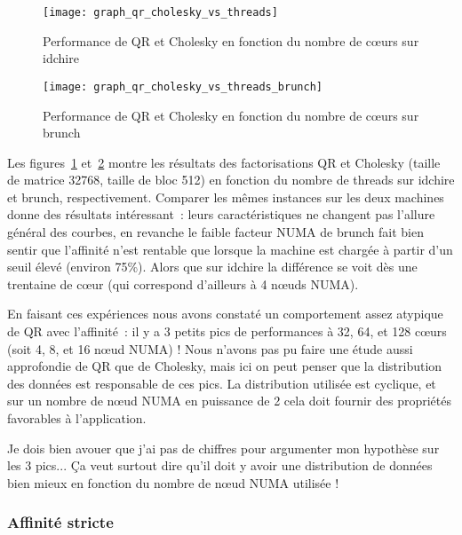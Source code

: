 \begin{figure}[t!]
  \centering
  \texttt{[image: graph\_qr\_cholesky\_vs\_threads]}
  \caption{Performance de QR et Cholesky en fonction du nombre de cœurs sur idchire}\label{fig:contribs:perf_eval:eval-qr-cholesky-idchire}
\end{figure}
\begin{figure}[h!]
  \centering
  \texttt{[image: graph\_qr\_cholesky\_vs\_threads\_brunch]}
  \caption{Performance de QR et Cholesky en fonction du nombre de cœurs sur brunch}\label{fig:contribs:perf_eval:eval-qr-cholesky-brunch}
\end{figure}

Les figures~\ref{fig:contribs:perf_eval:eval-qr-cholesky-idchire} et~\ref{fig:contribs:perf_eval:eval-qr-cholesky-brunch} montre les résultats des factorisations QR et Cholesky (taille de matrice 32768, taille de bloc 512) en fonction du nombre de threads sur idchire et brunch, respectivement.
Comparer les mêmes instances sur les deux machines donne des résultats intéressant~: leurs caractéristiques ne changent pas l'allure général des courbes, en revanche le faible facteur NUMA de brunch fait bien sentir que l'affinité n'est rentable que lorsque la machine est chargée à partir d'un seuil élevé (environ 75\%).
Alors que sur idchire la différence se voit dès une trentaine de cœur (qui correspond d'ailleurs à 4 nœuds NUMA).

En faisant ces expériences nous avons constaté un comportement assez atypique de QR avec l'affinité~: il y a 3 petits pics de performances à 32, 64, et 128 cœurs (soit 4, 8, et 16 nœud NUMA) !
Nous n'avons pas pu faire une étude aussi approfondie de QR que de Cholesky, mais ici on peut penser que la distribution des données est responsable de ces pics. La distribution utilisée est cyclique, et sur un nombre de nœud NUMA en puissance de 2 cela doit fournir des propriétés favorables à l'application.

\begin{todo}
  Je dois bien avouer que j'ai pas de chiffres pour argumenter mon hypothèse sur les 3 pics...
  Ça veut surtout dire qu'il doit y avoir une distribution de données bien mieux en fonction du nombre de nœud NUMA utilisée !
\end{todo}


\subsubsection{Affinité stricte}

